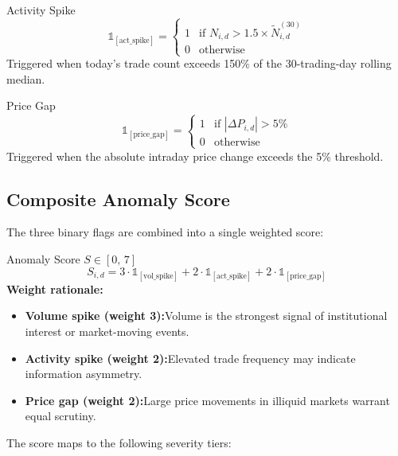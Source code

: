 \documentclass[
  11pt,
  a4paper,
  twoside,
  openany
]{report}
\begin{document}
\begin{formulabox}{Activity Spike}
\[
  \mathbb{1}_{[\text{act\_spike}]} =
  \begin{cases}
    1 & \text{if } N_{i,d} > 1.5 \times \tilde{N}_{i,d}^{(30)} \\
    0 & \text{otherwise}
  \end{cases}
\]
Triggered when today's trade count exceeds 150\% of the 30-trading-day rolling median.
\end{formulabox}

\begin{formulabox}{Price Gap}
\[
  \mathbb{1}_{[\text{price\_gap}]} =
  \begin{cases}
    1 & \text{if } |\Delta P_{i,d}| > 5\% \\
    0 & \text{otherwise}
  \end{cases}
\]
Triggered when the absolute intraday price change exceeds the 5\% threshold.
\end{formulabox}

\subsection{Composite Anomaly Score}

The three binary flags are combined into a single weighted score:

\begin{formulabox}{Anomaly Score $S \in [0,\,7]$}
\[
  \boxed{\;S_{i,d} = 3 \cdot \mathbb{1}_{[\text{vol\_spike}]} + 2 \cdot \mathbb{1}_{[\text{act\_spike}]} + 2 \cdot \mathbb{1}_{[\text{price\_gap}]}\;}
\]
\textbf{Weight rationale:}
\begin{itemize}
  \item \textbf{Volume spike (weight 3):}\;Volume is the strongest signal of institutional interest or market-moving events.
  \item \textbf{Activity spike (weight 2):}\;Elevated trade frequency may indicate information asymmetry.
  \item \textbf{Price gap (weight 2):}\;Large price movements in illiquid markets warrant equal scrutiny.
\end{itemize}
\end{formulabox}

The score maps to the following severity tiers:
\end{document}

